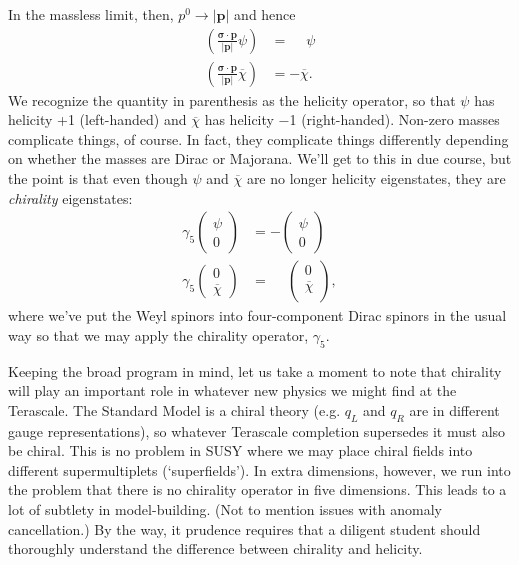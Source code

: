 \documentclass[12pt, oneside]{report}    %
\begin{document}
In the massless limit, then, $p^0\rightarrow |\mathbf p|$ and hence 
\begin{align}
    \left(\frac{\mathbf\sigma\cdot\mathbf p}{|\mathbf{p}|}\psi\right) &= \phantom+ \psi\\
    \left(\frac{\mathbf\sigma\cdot\mathbf p}{|\mathbf{p}|}\overline\chi\right) &= -\overline\chi.
\end{align}
We recognize the quantity in parenthesis as the helicity operator, so that $\psi$ has helicity +1 (left-handed) and $\overline\chi$ has helicity $-$1 (right-handed). Non-zero masses complicate things, of course. In fact, they complicate things differently depending on whether the masses are Dirac or Majorana. We'll get to this in due course, but the point is that even though $\psi$ and $\overline\chi$ are no longer helicity eigenstates, they are \emph{chirality} eigenstates:
\begin{align}
    \gamma_5\begin{pmatrix}\psi\\0\end{pmatrix} &= -\begin{pmatrix}\psi\\0\end{pmatrix}\\
    \gamma_5\begin{pmatrix}0\\\overline\chi\end{pmatrix} &=\phantom - \begin{pmatrix}0\\\overline\chi\\\end{pmatrix},
\end{align}
where we've put the Weyl spinors into four-component Dirac spinors in the usual way so that we may apply the chirality operator, $\gamma_5$. %
\begin{example}
Keeping the broad program in mind, let us take a moment to note that chirality will play an important role in whatever new physics we might find at the Terascale. The Standard Model is a chiral theory (e.g. $q_L$ and $q_R$ are in different gauge representations), so whatever Terascale completion supersedes it must also be chiral. This is no problem in SUSY where we may place chiral fields into different supermultiplets (`superfields'). In extra dimensions, however, we run into the problem that there is no chirality operator in five dimensions. This leads to a lot of subtlety in model-building. (Not to mention issues with anomaly cancellation.) By the way, it prudence requires that a diligent student should thoroughly understand the difference between chirality and helicity.
\end{example}
\end{document}
